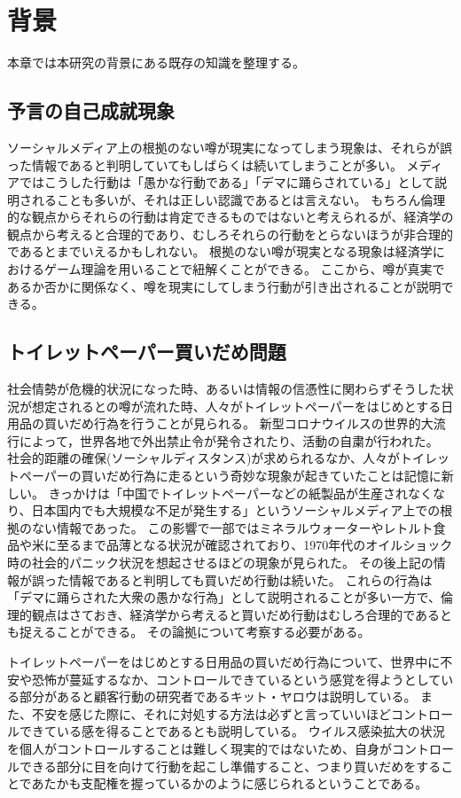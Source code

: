 \chapter{背景}
\label{background}

本章では本研究の背景にある既存の知識を整理する。

\section{予言の自己成就現象}
ソーシャルメディア上の根拠のない噂が現実になってしまう現象は、それらが誤った情報であると判明していてもしばらくは続いてしまうことが多い。
メディアではこうした行動は「愚かな行動である」「デマに踊らされている」として説明されることも多いが、それは正しい認識であるとは言えない。
もちろん倫理的な観点からそれらの行動は肯定できるものではないと考えられるが、経済学の観点から考えると合理的であり、むしろそれらの行動をとらないほうが非合理的であるとまでいえるかもしれない。
根拠のない噂が現実となる現象は経済学におけるゲーム理論を用いることで紐解くことができる。
ここから、噂が真実であるか否かに関係なく、噂を現実にしてしまう行動が引き出されることが説明できる。

\section{トイレットペーパー買いだめ問題}
社会情勢が危機的状況になった時、あるいは情報の信憑性に関わらずそうした状況が想定されるとの噂が流れた時、人々がトイレットペーパーをはじめとする日用品の買いだめ行為を行うことが見られる。
新型コロナウイルスの世界的大流行によって，世界各地で外出禁止令が発令されたり、活動の自粛が行われた。
社会的距離の確保(ソーシャルディスタンス)が求められるなか、人々がトイレットペーパーの買いだめ行為に走るという奇妙な現象が起きていたことは記憶に新しい。
きっかけは「中国でトイレットペーパーなどの紙製品が生産されなくなり、日本国内でも大規模な不足が発生する」というソーシャルメディア上での根拠のない情報であった。
この影響で一部ではミネラルウォーターやレトルト食品や米に至るまで品薄となる状況が確認されており、1970年代のオイルショック時の社会的パニック状況を想起させるほどの現象が見られた。
その後上記の情報が誤った情報であると判明しても買いだめ行動は続いた。
これらの行為は「デマに踊らされた大衆の愚かな行為」として説明されることが多い一方で、倫理的観点はさておき、経済学から考えると買いだめ行動はむしろ合理的であるとも捉えることができる。
その論拠について考察する必要がある。

トイレットペーパーをはじめとする日用品の買いだめ行為について、世界中に不安や恐怖が蔓延するなか、コントロールできているという感覚を得ようとしている部分があると顧客行動の研究者であるキット・ヤロウは説明している。
また、不安を感じた際に、それに対処する方法は必ずと言っていいほどコントロールできている感を得ることであるとも説明している。
ウイルス感染拡大の状況を個人がコントロールすることは難しく現実的ではないため、自身がコントロールできる部分に目を向けて行動を起こし準備すること、つまり買いだめをすることであたかも支配権を握っているかのように感じられるということである。



